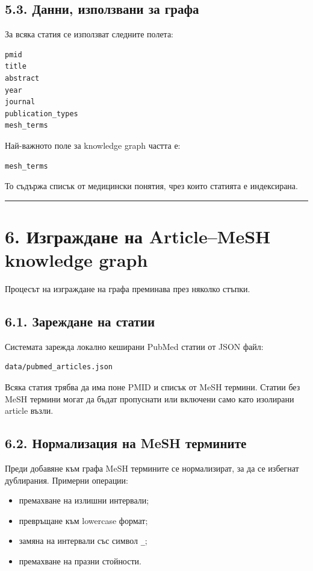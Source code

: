 \documentclass[12pt,a4paper]{article}
\providecommand{\tightlist}{\setlength{\itemsep}{0pt}\setlength{\parskip}{0pt}}
\begin{document}
\subsection{5.3. Данни, използвани за графа}

За всяка статия се използват следните полета:

\begin{verbatim}
pmid
title
abstract
year
journal
publication_types
mesh_terms
\end{verbatim}

Най-важното поле за knowledge graph частта е:

\begin{verbatim}
mesh_terms
\end{verbatim}

То съдържа списък от медицински понятия, чрез които статията е индексирана.

\vspace{0.5em}\hrule\vspace{1.0em}

\section{6. Изграждане на Article--MeSH knowledge graph}

Процесът на изграждане на графа преминава през няколко стъпки.

\subsection{6.1. Зареждане на статии}

Системата зарежда локално кеширани PubMed статии от JSON файл:

\begin{verbatim}
data/pubmed_articles.json
\end{verbatim}

Всяка статия трябва да има поне PMID и списък от MeSH термини. Статии без MeSH термини могат да бъдат пропуснати или включени само като изолирани article възли.

\subsection{6.2. Нормализация на MeSH термините}

Преди добавяне към графа MeSH термините се нормализират, за да се избегнат дублирания. Примерни операции:

\begin{itemize}
\tightlist
\item
  премахване на излишни интервали;
\item
  превръщане към lowercase формат;
\item
  замяна на интервали със символ \texttt{\_};
\item
  премахване на празни стойности.
\end{itemize}
\end{document}
